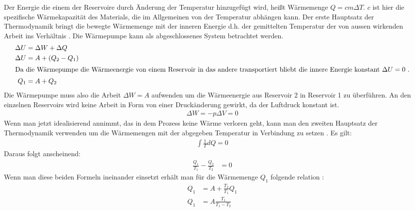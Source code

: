 Der Energie die einem der Reservoire durch Änderung der Temperatur hinzugefügt wird,
heißt Wärmemenge $ Q = c m \Delta T $. 
$ c $ ist hier die spezifische Wärmekapazität des Materials, die im Allgemeinen von der Temperatur abhängen kann.
Der erste Hauptsatz der Thermodynamik bringt die bewegte Wärmemenge mit der inneren Energie d.h. der gemittelten Temperatur
der von aussen wirkenden Arbeit ins Verhältnis \cite[vgl][318]{demtroeder}. 
Die Wärmepumpe kann als abgeschlossenes System betrachtet werden. 
\begin{align}
                \Delta U &= \Delta W + \Delta Q \\
    \nonumber   \Delta U &= A + (Q_{2} - Q_{1}) \\
\intertext{Da die Wärmepumpe die Wärmeenergie von einem Reservoir in das andere transportiert
    bliebt die innere Energie konstant $ \Delta U = 0 $ .} 
                Q_{1}    &= A + Q_{2} %
\end{align}
%
Die Wärmepumpe muss also die Arbeit $\Delta W = A$ aufwenden um die Wärmeenergie aus Reservoir 2 in Reservoir 1 zu überführen.
An den einzelnen Reservoirs wird keine Arbeit in Form von einer Druckänderung gewirkt, da der Luftdruck konstant ist.
\begin{align}
    \Delta W = - p \Delta V = 0 
\end{align}
Wenn man jetzt idealisierend annimmt, das in dem Prozess keine Wärme verloren geht, kann man den zweiten Hauptsatz der Thermodynamik
verwenden um die Wärmemengen mit der abgegeben Temperatur in Verbindung zu setzen \cite[vgl.][1]{man:v206}. 
Es gilt:
\begin{align}
    \int \frac{1}{T} dQ = 0 %
\end{align}
Daraus folgt anscheinend:
\begin{align}
    \frac{Q_{1}}{T_{1}} - \frac{Q_{2}}{T_{2}} &= 0
\end{align}
Wenn man diese beiden Formeln ineinander einsetzt erhält man für die Wärmemenge $Q_1$ folgende relation \cite{man:v206}: 
\begin{align}
    Q_1 &= A + \frac{T_2}{T_1}Q_1 \\
    Q_1 &= A \frac{T_1}{T_1 - T_2}
\end{align}

